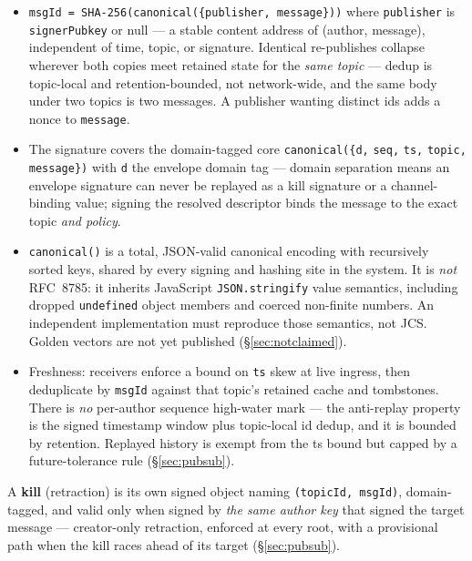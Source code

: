 \documentclass[nobib]{tufte-handout}
\begin{document}
\begin{itemize}
\item \texttt{msgId = SHA-256(canonical(\{publisher, message\}))} where
  \texttt{publisher} is \texttt{signerPubkey} or null --- a stable
  content address of (author, message), independent of time, topic, or
  signature. Identical re-publishes collapse wherever both copies meet
  retained state for the \emph{same topic} --- dedup is topic-local and
  retention-bounded, not network-wide, and the same body under two topics
  is two messages. A publisher wanting distinct ids adds a nonce to
  \texttt{message}.
\item The signature covers the domain-tagged core
  \texttt{canonical(\{d,} \texttt{seq,} \texttt{ts,} \texttt{topic,}
  \texttt{message\})} with \texttt{d} the envelope domain tag ---
  domain separation means an envelope signature can never be replayed as
  a kill signature or a channel-binding value; signing the resolved
  descriptor binds the message to the exact topic \emph{and policy}.
\item \texttt{canonical()} is a total, JSON-valid canonical encoding
  with recursively sorted keys, shared by every signing and hashing site
  in the system. It is \emph{not} RFC~8785: it inherits JavaScript
  \texttt{JSON.stringify} value semantics, including dropped
  \texttt{undefined} object members and coerced non-finite numbers. An
  independent implementation must reproduce those semantics, not JCS.
  Golden vectors are not yet published (\S\ref{sec:notclaimed}).
\item Freshness: receivers enforce a bound on \texttt{ts} skew at live
  ingress, then deduplicate by \texttt{msgId} against that topic's
  retained cache and tombstones. There is \emph{no} per-author sequence
  high-water mark --- the anti-replay property is the signed timestamp
  window plus topic-local id dedup, and it is bounded by retention.
  Replayed history is exempt from the ts bound but capped by a
  future-tolerance rule (\S\ref{sec:pubsub}).
\end{itemize}

A \textbf{kill} (retraction) is its own signed object naming
\texttt{(topicId, msgId)}, domain-tagged, and valid only when signed by
\emph{the same author key} that signed the target message --- creator-only
retraction, enforced at every root, with a provisional path when the kill
races ahead of its target (\S\ref{sec:pubsub}).

\end{document}
